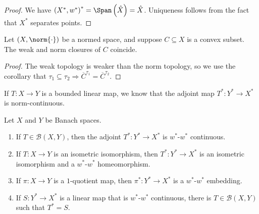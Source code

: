 \documentclass[10pt]{mypackage}
\begin{document}
\begin{proof}
  We have $\left(X^{\ast},w^{\ast}\right)^{\ast} = \Span\left(\hat{X}\right) = \hat{X}$. Uniqueness follows from the fact that $X^{\ast}$ separates points.
\end{proof}
\begin{theorem}
  Let $\left(X,\norm{\cdot}\right)$ be a normed space, and suppose $C\subseteq X$ is a convex subset. The weak and norm closures of $C$ coincide.
\end{theorem}
\begin{proof}
  The weak topology is weaker than the norm topology, so we use the corollary that $\tau_1\subseteq \tau_2 \Rightarrow \overline{C}^{\tau_1} = \overline{C}^{\tau_2}$.
\end{proof}
If $T:X\rightarrow Y$ is a bounded linear map, we know that the adjoint map $T^{\ast}: Y^{\ast}\rightarrow X^{\ast}$ is norm-continuous.
\begin{lemma}
  Let $X$ and $Y$ be Banach spaces.
  \begin{enumerate}[(1)]
    \item If $T\in \mathcal{B}\left(X,Y\right)$, then the adjoint $T^{\ast}:Y^{\ast}\rightarrow X^{\ast}$ is $w^{\ast}$-$w^{\ast}$ continuous.
    \item If $T: X\rightarrow Y$ is an isometric isomorphism, then $T^{\ast}:Y^{\ast}\rightarrow X^{\ast}$ is an isometric isomorphism and a $w^{\ast}$-$w^{\ast}$ homeomorphism.
    \item If $\pi: X\rightarrow Y$ is a $1$-quotient map, then $\pi^{\ast}:Y^{\ast}\rightarrow X^{\ast}$ is a $w^{\ast}$-$w^{\ast}$ embedding.
    \item If $S: Y^{\ast}\rightarrow X^{\ast}$ is a linear map that is $w^{\ast}$-$w^{\ast}$ continuous, there is $T\in \mathcal{B}\left(X,Y\right)$ such that $T^{\ast} = S$.
  \end{enumerate}
\end{lemma}
\end{document}
